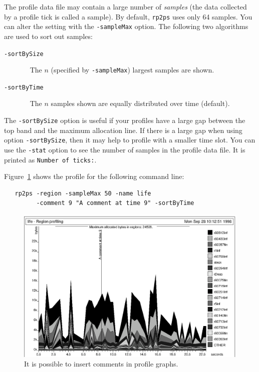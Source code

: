 \documentclass[12pt]{book}
\begin{document}
The profile data file may contain a large number of \emph{samples}
(the data collected by a profile tick is called a sample). By default,
\texttt{rp2ps} uses only 64 samples. You can alter the setting with the
%
\texttt{-sampleMax} option. The following two algorithms are used to sort
out samples:
\begin{description}
\item[{\tt -sortBySize}]~
  The $n$ (specified by \texttt{-sampleMax}) largest samples are
  shown.
\item[{\tt -sortByTime}]~
  The $n$ samples shown are equally distributed over time (default).
\end{description}
The \texttt{-sortBySize} option is useful if your profiles have a
large gap between the top band and the maximum allocation line.  If
there is a large gap when using option \texttt{-sortBySize}, then it
may help to profile with a smaller time slot. You can use the
%
{\tt -stat} option to see the number of samples in the profile data
file. It is printed as \texttt{Number of ticks:}.

Figure~\ref{prof_eks4.fig} shows the profile for the following
command line:
\begin{verbatim}
   rp2ps -region -sampleMax 50 -name life
         -comment 9 "A comment at time 9" -sortByTime
\end{verbatim}

\begin{figure}
\begin{center}
  \includegraphics{prof_eks4.ps}
\end{center}
\caption{It is possible to insert comments in profile graphs.}
\label{prof_eks4.fig}
\end{figure}
\end{document}
